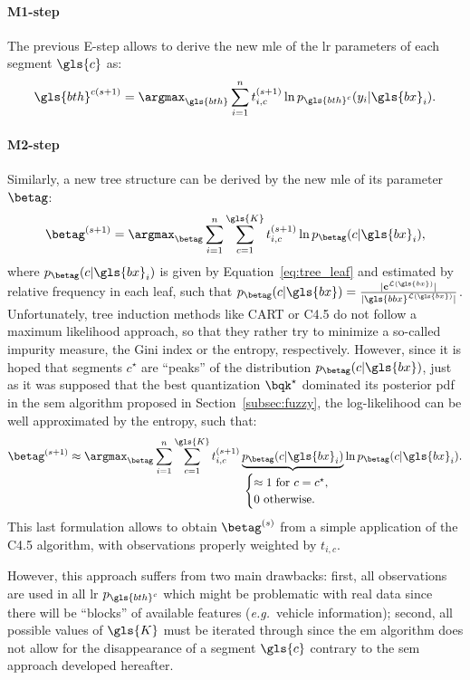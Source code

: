 \paragraph{M1-step}
The previous E-step allows to derive the new \gls{mle} of the \gls{lr} parameters of each segment $\gls{c}$ as:
\[ \gls{bth}^{c(s+1)} = \argmax_{\gls{bth}} \sum_{i=1}^n t_{i,c}^{(s+1)} \ln p_{\gls{bth}^c}(y_i | \gls{bx}_i). \]

\paragraph{M2-step}
Similarly, a new tree structure can be derived by the new \gls{mle} of its parameter $\betag$:
\[ \betag^{(s+1)} = \argmax_{\betag} \sum_{i=1}^n \sum_{c=1}^{\gls{K}} t_{i,c}^{(s+1)} \ln p_{\betag}( c | \gls{bx}_i), \]
where $p_{\betag}( c | \gls{bx}_i)$ is given by Equation~\eqref{eq:tree_leaf} and estimated by relative frequency in each leaf, such that $p_{\betag}(c | \gls{bx}) = \frac{|\mathbf{c}^{\mathcal{L}(\gls{bx})}|}{|\gls{bbx}^{\mathcal{L}(\gls{bx})}|}$. Unfortunately, tree induction methods like CART or C4.5 do not follow a maximum likelihood approach, so that they rather try to minimize a so-called impurity measure, the Gini index or the entropy, respectively. However, since it is hoped that segments $c^\star$ are ``peaks'' of the distribution $p_{\betag}( c | \gls{bx})$, just as it was supposed that the best quantization $\bqk^\star$ dominated its posterior \gls{pdf} in the \gls{sem} algorithm proposed in Section~\ref{subsec:fuzzy}, the log-likelihood can be well approximated by the entropy, such that:
\[ \betag^{(s+1)} \approx \argmax_{\betag} \sum_{i=1}^n \sum_{c=1}^{\gls{K}} t_{i,c}^{(s+1)} \underbrace{p_{\betag}( c | \gls{bx}_i)}_{\begin{cases} \approx 1 \text{ for } c = c^\star, \\ 0 \text{ otherwise.} \end{cases}} \ln p_{\betag}( c | \gls{bx}_i). \]
This last formulation allows to obtain $\betag^{(s)}$ from a simple application of the C4.5 algorithm, with observations properly weighted by $t_{i,c}$.

However, this approach suffers from two main drawbacks: first, all observations are used in all \gls{lr} $p_{\gls{bth}^c}$ which might be problematic with real data since there will be ``blocks'' of available features (\textit{e.g.}\ vehicle information); second, all possible values of $\gls{K}$ must be iterated through since the \gls{em} algorithm does not allow for the disappearance of a segment $\gls{c}$ contrary to the \gls{sem} approach developed hereafter.

